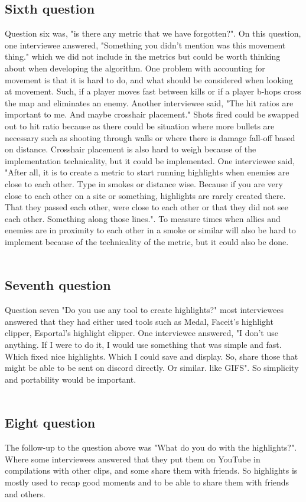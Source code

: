 \subsection{Sixth question}
Question six was, "is there any metric that we have forgotten?". On this question, one interviewee answered, "Something you didn't mention was this movement thing." which we did not include in the metrics but could be worth thinking about when developing the algorithm. One problem with accounting for movement is that it is hard to do, and what should be considered when looking at movement. Such, if a player moves fast between kills or if a player b-hops cross the map and eliminates an enemy. Another interviewee said, "The hit ratios are important to me. And maybe crosshair placement." Shots fired could be swapped out to hit ratio because as there could be situation where more bullets are necessary such as shooting through walls or where there is damage fall-off based on distance. Crosshair placement is also hard to weigh because of the implementation technicality, but it could be implemented. One interviewee said, "After all, it is to create a metric to start running highlights when enemies are close to each other. Type in smokes or distance wise. Because if you are very close to each other on a site or something, highlights are rarely created there. That they passed each other, were close to each other or that they did not see each other. Something along those lines.". To measure times when allies and enemies are in proximity to each other in a smoke or similar will also be hard to implement because of the technicality of the metric, but it could also be done. \\\\
\subsection{Seventh question}
Question seven "Do you use any tool to create highlights?" most interviewees answered that they had either used tools such as Medal, Faceit's highlight clipper, Esportal's highlight clipper. One interviewee answered, "I don't use anything. If I were to do it, I would use something that was simple and fast. Which fixed nice highlights. Which I could save and display. So, share those that might be able to be sent on discord directly. Or similar. like GIFS". So simplicity and portability would be important.\\\\
\subsection{Eight question}
The follow-up to the question above was "What do you do with the highlights?". Where some interviewees answered that they put them on YouTube in compilations with other clips, and some share them with friends. So highlights is mostly used to recap good moments and to be able to share them with friends and others.
\\\\
